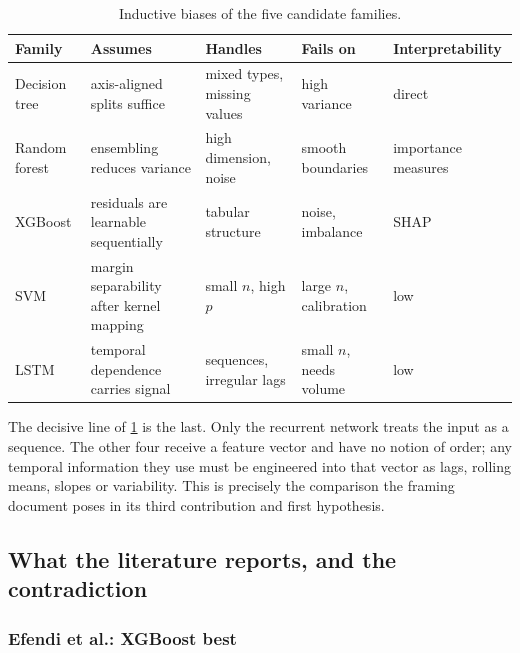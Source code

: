\documentclass[12pt,a4paper,oneside]{report}
\begin{document}
\begin{table}[htbp]
\centering\footnotesize
\caption{Inductive biases of the five candidate families.}\label{tab:inductive-bias}
\begin{tabularx}{\textwidth}{@{}>{\raggedright\arraybackslash}p{2.3cm} >{\raggedright\arraybackslash}X >{\raggedright\arraybackslash}X >{\raggedright\arraybackslash}X >{\raggedright\arraybackslash}p{2.3cm}@{}}
\toprule
\textbf{Family} & \textbf{Assumes} & \textbf{Handles} & \textbf{Fails on} & \textbf{Interpretability} \\
\midrule
Decision tree & axis-aligned splits suffice & mixed types, missing values & high variance & direct \\
Random forest & ensembling reduces variance & high dimension, noise & smooth boundaries & importance measures \\
XGBoost & residuals are learnable sequentially & tabular structure & noise, imbalance & SHAP \\
SVM & margin separability after kernel mapping & small $n$, high $p$ & large $n$, calibration & low \\
LSTM & temporal dependence carries signal & sequences, irregular lags & small $n$, needs volume & low \\
\bottomrule
\end{tabularx}
\end{table}

The decisive line of \cref{tab:inductive-bias} is the last. Only the recurrent network treats the input as a sequence. The other four receive a feature vector and have no notion of order; any temporal information they use must be engineered into that vector as lags, rolling means, slopes or variability. This is precisely the comparison the framing document poses in its third contribution and first hypothesis.

\subsection{What the literature reports, and the contradiction}\label{sec:reported}

\subsubsection{Efendi et al.: XGBoost best}
\end{document}
